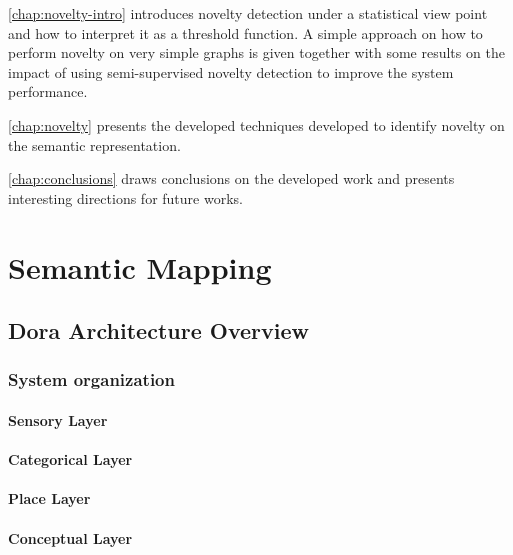 \autoref{chap:novelty-intro} introduces novelty detection under a
statistical view point and how to interpret it as a threshold function.
A simple approach on how to perform novelty on very simple graphs
is given together with some results on the impact of using semi-supervised
novelty detection to improve the system performance.

\autoref{chap:novelty} presents the developed techniques developed to identify
novelty on the semantic representation.

\autoref{chap:conclusions} draws conclusions on the developed work and presents
interesting directions for future works.





\chapter{Semantic Mapping}\label{chap:semantic-mapping}

% 

\section{Dora Architecture Overview}
\subsection{System organization}
\subsubsection{Sensory Layer}
\subsubsection{Categorical Layer}
\subsubsection{Place Layer}
\subsubsection{Conceptual Layer}

